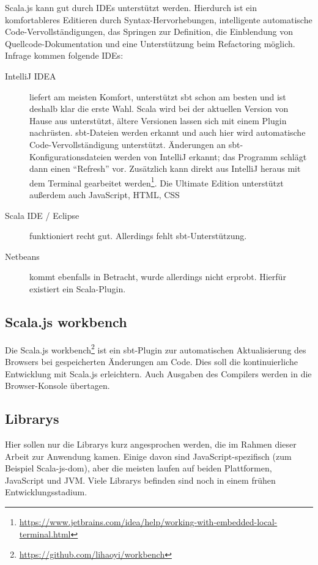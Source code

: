 \documentclass[a4paper, 12pt, hidelinks, listof=totoc, listoftables=totoc, bibliography=totoc]{scrreprt}
\begin{document}
Scala.js kann gut durch \ac{IDE}s unterstützt werden. Hierdurch ist ein komfortableres Editieren durch Syntax-Hervorhebungen, intelligente automatische Code-Vervollständigungen, das Springen zur Definition, die Einblendung von Quellcode-Dokumentation und eine Unterstützung beim Refactoring möglich. \cite{doeraene2015.SNL} Infrage kommen folgende \ac{IDE}s:

\begin{description}
	\item[IntelliJ IDEA] liefert am meisten Komfort, unterstützt sbt schon am besten und ist deshalb klar die erste Wahl. Scala wird bei der aktuellen Version von Hause aus unterstützt, ältere Versionen lassen sich mit einem Plugin nachrüsten. sbt-Dateien werden erkannt und auch hier wird automatische Code-Vervollständigung unterstützt. Änderungen an sbt-Konfigurationsdateien werden von IntelliJ erkannt; das Programm schlägt dann einen "`Refresh"' vor. Zusätzlich kann direkt aus IntelliJ heraus mit dem Terminal gearbeitet werden\footnote{\url{https://www.jetbrains.com/idea/help/working-with-embedded-local-terminal.html}}. Die Ultimate Edition unterstützt außerdem auch JavaScript, \ac{HTML}, \ac{CSS}
	\item[Scala IDE / Eclipse] funktioniert recht gut. Allerdings fehlt sbt-Unterstützung.
	\item[Netbeans] kommt ebenfalls in Betracht, wurde allerdings nicht erprobt. Hierfür existiert ein Scala-Plugin.
\end{description}



\subsection{Scala.js workbench}

Die Scala.js workbench\footnote{\url{https://github.com/lihaoyi/workbench}} ist ein sbt-Plugin zur automatischen Aktualisierung des Browsers 
bei gespeicherten Änderungen am Code. Dies soll die kontinuierliche Entwicklung mit Scala.js erleichtern. Auch Ausgaben des Compilers werden in die Browser-Konsole übertagen.


\subsection{Librarys}

Hier sollen nur die Librarys kurz angesprochen werden, die im Rahmen dieser Arbeit zur Anwendung kamen. Einige davon sind JavaScript-spezifisch (zum Beispiel Scala-js-dom), aber die meisten laufen auf beiden Plattformen, JavaScript und \ac{JVM}. Viele Librarys befinden sind noch in einem frühen Entwicklungsstadium.
\end{document}
